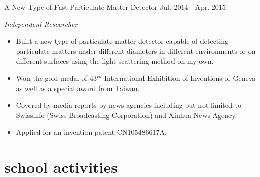 \documentclass[hidelinks]{adamyi-cv} %
\begin{document}
\begin{entrylist}
\entry
{A New Type of Fast Particulate Matter Detector}
{Jul. 2014 - Apr. 2015}
{\emph{Independent Researcher}
\begin{itemize}
\item Built a new type of particulate matter detector capable of detecting particulate matters under different diameters in different environments or on different surfaces using the light scattering method on my own.
\item Won the gold medal of 43$^{rd}$ International Exhibition of Inventions of Geneva as well as a special award from Taiwan.
\item Covered by media reports by news agencies including but not limited to  Swissinfo (Swiss Broadcasting Corporation) and Xinhua News Agency.
\item Applied for an invention patent CN105486617A.
\end{itemize}}


\end{entrylist}




\section{school activities}
\end{document}
